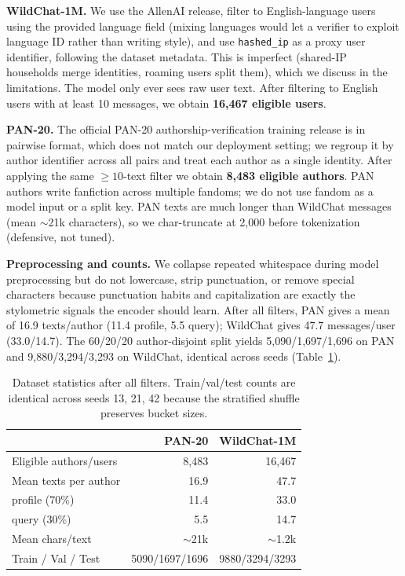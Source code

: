 \documentclass[11pt]{article}
\begin{document}
\noindent\textbf{WildChat-1M.} We use the AllenAI release, filter to English-language users using the provided language field (mixing languages would let a verifier to exploit language ID rather than writing style), and use \texttt{hashed\_ip} as a proxy user identifier, following the dataset metadata. This is imperfect (shared-IP households merge identities, roaming users split them), which we discuss in the limitations. The model only ever sees raw user text. After filtering to English users with at least 10 messages, we obtain \textbf{16,467 eligible users}.

\noindent\textbf{PAN-20.} The official PAN-20 authorship-verification training release is in pairwise format, which does not match our deployment setting; we regroup it by author identifier across all pairs and treat each author as a single identity. After applying the same $\geq 10$-text filter we obtain \textbf{8,483 eligible authors}. PAN authors write fanfiction across multiple fandoms; we do not use fandom as a model input or a split key. PAN texts are much longer than WildChat messages (mean $\sim$21k characters), so we char-truncate at 2{,}000 before tokenization (defensive, not tuned).

\noindent\textbf{Preprocessing and counts.} We collapse repeated whitespace during model preprocessing but do not lowercase, strip punctuation, or remove special characters because punctuation habits and capitalization are exactly the stylometric signals the encoder should learn. After all filters, PAN gives a mean of 16.9 texts/author (11.4 profile, 5.5 query); WildChat gives 47.7 messages/user (33.0/14.7). The 60/20/20 author-disjoint split yields 5{,}090/1{,}697/1{,}696 on PAN and 9{,}880/3{,}294/3{,}293 on WildChat, identical across seeds (Table~\ref{tab:datastats}).

\begin{table}[t]
\centering
\small
\begin{tabular}{lrr}
\toprule
& \textbf{PAN-20} & \textbf{WildChat-1M} \\
\midrule
Eligible authors/users     & 8{,}483   & 16{,}467 \\
Mean texts per author      & 16.9      & 47.7 \\
\quad profile (70\%)       & 11.4      & 33.0 \\
\quad query (30\%)         & 5.5       & 14.7 \\
Mean chars/text            & $\sim$21k & $\sim$1.2k \\
Train / Val / Test         & 5090/1697/1696 & 9880/3294/3293 \\
\bottomrule
\end{tabular}
\caption{Dataset statistics after all filters. Train/val/test counts are identical across seeds 13, 21, 42 because the stratified shuffle preserves bucket sizes.}
\label{tab:datastats}
\end{table}
\end{document}
